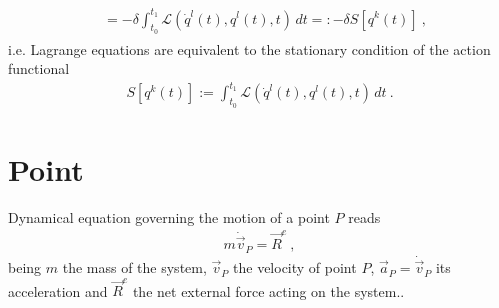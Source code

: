 \documentclass[letterpaper,10pt,english]{jupyterBook}
\begin{document}
\begin{itemize}
\begin{equation*}
\begin{split}
\begin{aligned}
       & = - \delta \int_{t_0}^{t_1} \mathscr{L}(\dot{q}^l(t), q^l(t), t) \, dt =: - \delta S[q^k(t)] \ ,
   \end{aligned}\end{split}
\end{equation*}
\sphinxAtStartPar
i.e. Lagrange equations are equivalent to the stationary condition of the action functional
\begin{equation*}
\begin{split}S[q^k(t)]:= \int_{t_0}^{t_1} \mathscr{L}\left(\dot{q}^l(t), q^l(t), t\right) \, dt \ .\end{split}
\end{equation*}
\end{itemize}



\sphinxstepscope




\section{Point}
\label{\detokenize{ch/lagrange-point:point}}\label{\detokenize{ch/lagrange-point:classical-mechanics-lagrange-point}}\label{\detokenize{ch/lagrange-point::doc}}
\sphinxAtStartPar
{} Dynamical equation governing the motion of a point \(P\) reads
\begin{equation*}
\begin{split}m \dot{\vec{v}}_P = \vec{R}^e \ ,\end{split}
\end{equation*}
\sphinxAtStartPar
being \(m\) the mass of the system, \(\vec{v}_P\) the velocity of point \(P\), \(\vec{a}_P = \dot{\vec{v}}_P\) its acceleration and \(\vec{R}^{e}\) the net external force acting on the system..
\end{document}
